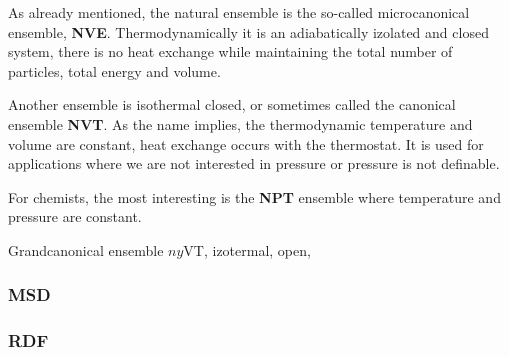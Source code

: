 As already mentioned, the natural ensemble is the so-called microcanonical ensemble, \textbf{NVE}. Thermodynamically it is an adiabatically izolated and closed system, there is no heat exchange while maintaining the total number of particles, total energy and volume. 

Another ensemble is isothermal closed, or sometimes called the canonical ensemble \textbf{NVT}. As the name implies, the thermodynamic temperature and volume are constant, heat exchange occurs with the thermostat. It is used for applications where we are not interested in pressure or pressure is not definable.

For chemists, the most interesting is the \textbf{NPT} ensemble where temperature and pressure are constant. 

Grandcanonical ensemble $ny$VT, izotermal, open, 

\subsubsection{MSD}
\subsubsection{RDF}